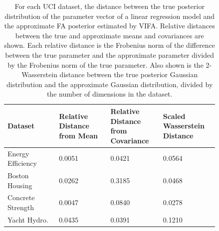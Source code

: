 \documentclass[msc,deptreport.inf]{infthesis} %
\begin{document}
\begin{table}[h!]
	\begin{center}
		\begin{tabular}{|| p{0.21\linewidth} p{0.21\linewidth} p{0.21\linewidth} p{0.21\linewidth} ||} 
 			\hline
 			Dataset & Relative Distance from Mean & Relative Distance from Covariance & Scaled Wasserstein Distance \\ [0.5ex] 
 			\hline\hline
			Energy Efficiency 	& 0.0051 	& 0.0421 & 0.0564 \\ 
			\hline
			Boston Housing 	& 0.0262 	& 0.3185 & 0.0468 \\ 
			\hline
			Concrete Strength 	& 0.0047 	& 0.0840 & 0.0278 \\ 
			\hline
 			Yacht Hydro. 		& 0.0435 	& 0.0391 & 0.1210 \\ [1ex] 
			\hline
		\end{tabular}
		\caption{For each UCI dataset, the distance between the true posterior distribution of the parameter vector of a linear regression model and the approximate FA posterior estimated by VIFA. Relative distances between the true and approximate means and covariances are shown. Each relative distance is the Frobenius norm of the difference between the true parameter and the approximate parameter divided by the Frobenius norm of the true parameter. Also shown is the 2-Wasserstein distance between the true posterior Gaussian distribution and the approximate Gaussian distribution, divided by the number of dimensions in the dataset.}
		\label{table:linear_regression_vi_posterior_uci}
	\end{center}
\end{table}
\end{document}
